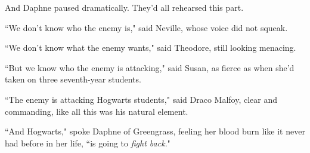 And Daphne paused dramatically. They'd all rehearsed this part.

``We don't know who the enemy is," said Neville, whose voice did not squeak.

``We don't know what the enemy wants," said Theodore, still looking menacing.

``But we know who the enemy is attacking," said Susan, as fierce as when she'd taken on three seventh-year students.

``The enemy is attacking Hogwarts students," said Draco Malfoy, clear and commanding, like all this was his natural element.

``And Hogwarts," spoke Daphne of Greengrass, feeling her blood burn like it never had before in her life, ``is going to \emph{fight back}."

